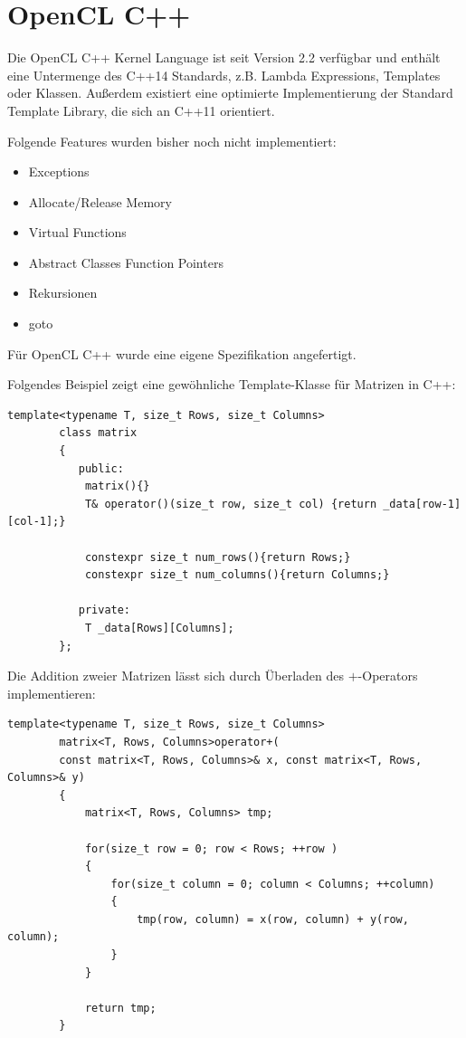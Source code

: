 		
		\section{OpenCL C++}\label{OCLC++}
		Die OpenCL C++ \Gls{Kernel} Language ist seit Version 2.2 verfügbar und enthält eine Untermenge des C++14 Standards, z.B. Lambda Expressions, Templates oder Klassen. Außerdem existiert eine optimierte Implementierung der Standard Template Library, die sich an C++11 orientiert. 
		
		Folgende Features wurden bisher noch nicht implementiert:
		\begin{itemize}
			\item Exceptions
			\item Allocate/Release Memory
			\item Virtual Functions 
			\item Abstract Classes Function Pointers
			\item Rekursionen 
			\item goto
		\end{itemize}
		
		Für OpenCL C++ wurde eine eigene Spezifikation angefertigt. \autocite{oclC++Spec}
		
		Folgendes Beispiel zeigt eine gewöhnliche Template-Klasse für Matrizen in C++:
		\begin{lstlisting}[caption=Matrix OpenCl C++]
		template<typename T, size_t Rows, size_t Columns>
		class matrix 
		{
		   public:
			matrix(){}
			T& operator()(size_t row, size_t col) {return _data[row-1][col-1];}

			constexpr size_t num_rows(){return Rows;}
			constexpr size_t num_columns(){return Columns;}
			
		   private:
			T _data[Rows][Columns];
		};
		\end{lstlisting}
		
		Die Addition zweier Matrizen lässt sich durch Überladen des $+$-Operators implementieren:
		\begin{lstlisting}[caption=Matrixaddition OpenCl C++]
		template<typename T, size_t Rows, size_t Columns> 
		matrix<T, Rows, Columns>operator+(
		const matrix<T, Rows, Columns>& x, const matrix<T, Rows, Columns>& y) 
		{
			matrix<T, Rows, Columns> tmp;
			
			for(size_t row = 0; row < Rows; ++row ) 
			{
				for(size_t column = 0; column < Columns; ++column) 
				{
					tmp(row, column) = x(row, column) + y(row, column);
				}
			}
			
			return tmp;
		}
		\end{lstlisting}
		
